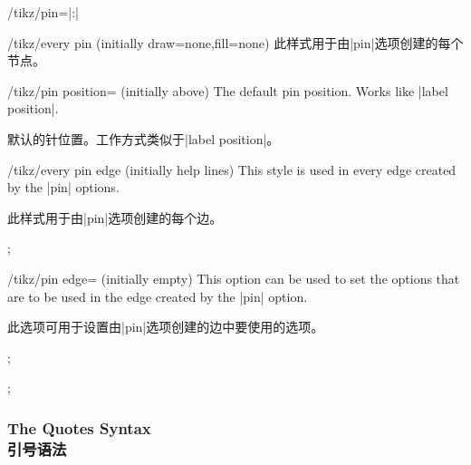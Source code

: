 \begin{key}{/tikz/pin=|:|}
\begin{stylekey}{/tikz/every pin (initially {draw=none,fill=none})}
        此样式用于由|pin|选项创建的每个节点。


    \end{stylekey}

    \begin{key}{/tikz/pin position= (initially above)}
        The default pin position. Works like |label position|.

        默认的针位置。工作方式类似于|label position|。
    \end{key}

    \begin{stylekey}{/tikz/every pin edge (initially help lines)}
        This style is used in every edge created by the |pin| options.
        
        此样式用于由|pin|选项创建的每个边。
\begin{codeexample}[preamble={\usetikzlibrary{decorations.pathmorphing}}]
\tikz [pin distance=15mm,
       every pin edge/.style={<-,shorten <=1pt,decorate,
                              decoration={snake,pre length=4pt}}]
  ;
\end{codeexample}
    \end{stylekey}

    \begin{key}{/tikz/pin edge= (initially \normalfont empty)}
        This option can be used to set the options that are to be used in the
        edge created by the |pin| option.
        
        此选项可用于设置由|pin|选项创建的边中要使用的选项。


\begin{codeexample}[]
\tikz[pin distance=10mm]
  ;
\end{codeexample}
\begin{codeexample}[]
\tikz [every pin edge/.style={},
       initial/.style={pin={[pin distance=5mm,
                             pin edge={<-,shorten <=1pt}]left:start}}]
  ;
\end{codeexample}
    \end{key}
\end{key}


\subsubsection{The Quotes Syntax\\引号语法}
\label{section-label-quotes}

